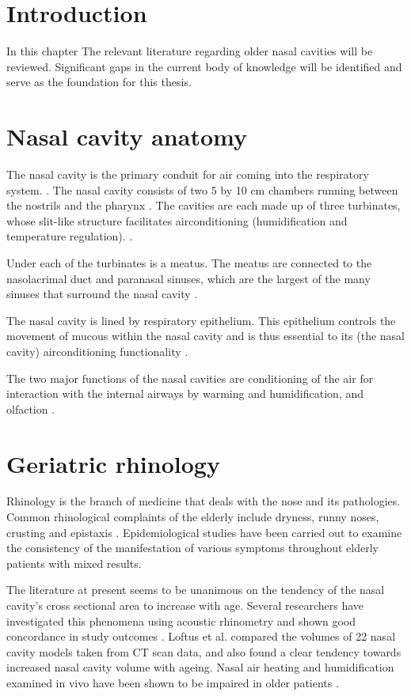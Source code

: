 \section{Introduction}

In this chapter The relevant literature regarding older nasal cavities will be reviewed. Significant gaps in the current body of knowledge will be identified and serve as the foundation for this thesis.

\section{Nasal cavity anatomy}

The nasal cavity is the primary conduit for air coming into the respiratory system. \cite{Elad2008}. The nasal cavity consists of two 5 by 10 cm chambers running between the nostrils and the pharynx \cite{Mygind1998}. The cavities are each made up of three turbinates, whose slit-like structure facilitates airconditioning (humidification and temperature regulation). \cite{Mygind1998}. 

Under each of the turbinates is a meatus. The meatus are connected to the nasolacrimal duct and paranasal sinuses, which are the largest of the many sinuses that surround the nasal cavity \cite{Mygind1998}. 

The nasal cavity is lined by respiratory epithelium. This epithelium controls the movement of mucous within the nasal cavity and is thus essential to its (the nasal cavity) airconditioning functionality \cite{Mygind1998}.

The two major functions of the nasal cavities are conditioning of the air for interaction with the internal airways by warming and humidification, and olfaction \cite{Doorly2008, Elad2008, Mygind1998, Berglund1982}.

\section{Geriatric rhinology}
Rhinology is the branch of medicine that deals with the nose and its pathologies. 
Common rhinological complaints of the elderly include dryness, runny noses, crusting and epistaxis \cite{Varga-Huettner2013}. Epidemiological studies have been carried out to examine the consistency of the manifestation of various symptoms throughout elderly patients with mixed results. 

The literature at present seems to be unanimous on the tendency of the nasal cavity's cross sectional area to increase with age. Several researchers have investigated this phenomena using acoustic rhinometry and shown good concordance in study outcomes \cite{Kalmovich2005, Edelstein1996,WhanKim2007,Lindemann2008}. Loftus et al. \cite{Loftus2016} compared the volumes of 22 nasal cavity models taken from CT scan data, and also found a clear tendency towards increased nasal cavity volume with ageing. Nasal air heating and humidification examined in vivo have been shown to be impaired in older patients \cite{Lindemann2008}. 

